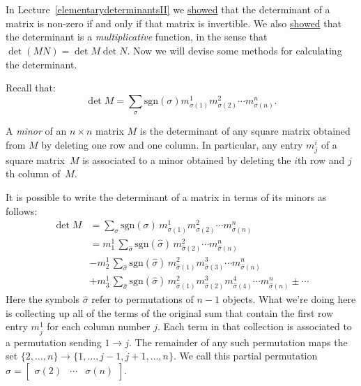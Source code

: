 
\chapter{\propDetTitle}

In Lecture~\ref{elementarydeterminantsII} we \hyperref[detinvertible]{showed} that the determinant of a matrix is non-zero if and only if that matrix is invertible.  We also \hyperref[detmultiplicative]{showed} that the determinant is a \emph{multiplicative} function, in the sense that $\det (MN)=\det M \det N$.  Now we will devise some methods for calculating the determinant.

Recall that:
\[
\det M = \sum_{\sigma} \text{sgn}(\sigma) m^1_{\sigma(1)}m^2_{\sigma(2)}\cdots m^n_{\sigma(n)}.
\]

A \emph{minor} of an $n\times n$ matrix $M$ is the determinant of any square matrix obtained from $M$ by deleting one row and one column.  In particular, any entry $m^i_j$ of a square matrix~$M$ is associated to a minor obtained by deleting the $i$th row and $j$th column of~$M$.

It is possible to write the determinant of a matrix in terms of  its minors as follows:
\begin{align*}
\det M &= \sum_{\sigma} \text{sgn}(\sigma)\, m^1_{\sigma(1)}m^2_{\sigma(2)}\cdots m^n_{\sigma(n)} \\
&= m^1_1\, \sum_{\hat{\sigma}} \text{sgn}(\hat{\sigma})\, m^2_{\hat{\sigma}(2)}\cdots m^n_{\hat{\sigma}(n)} \\
& -  m^1_2\, \sum_{\hat{\sigma}} \text{sgn}(\hat{\sigma})\, m^2_{\hat{\sigma}(1)}m^3_{\hat{\sigma}(3)}\cdots m^n_{\hat{\sigma}(n)} \\
& +  m^1_3\,  \sum_{\hat{\sigma}} \text{sgn}(\hat{\sigma})\, m^2_{\hat{\sigma}(1)}m^3_{\hat{\sigma}(2)}m^4_{\hat{\sigma}(4)}\cdots m^n_{\hat{\sigma}(n)} \pm \cdots
\end{align*}
Here the symbols $\hat{\sigma}$ refer to permutations of $n-1$ objects.  What we're doing here is collecting up all of the terms of the original sum that contain the first row entry $m^1_j$ for each column number $j$.  Each term in that collection is associated to a permutation sending $1\rightarrow j$.  The remainder of any such permutation maps the set $\{2, \ldots, n \}\rightarrow \{1, \ldots, j-1, j+1, \ldots, n \}$.  We call this partial permutation $\hat{\sigma}=\begin{bmatrix} \sigma(2) & \cdots & \sigma(n) \end{bmatrix}$.

